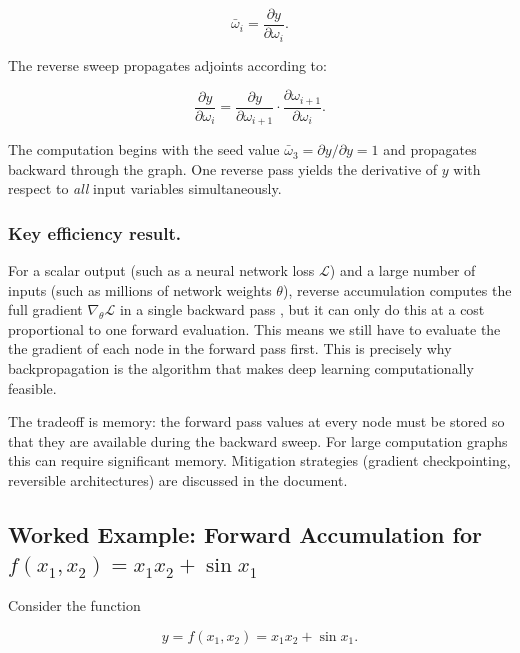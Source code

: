 \documentclass[12pt, a4paper]{article}
\begin{document}
\begin{equation}
  \bar{\omega}_i = \frac{\partial y}{\partial \omega_i}.
\end{equation}

The reverse sweep propagates adjoints according to:

\begin{equation}
  \frac{\partial y}{\partial \omega_i}
  = \frac{\partial y}{\partial \omega_{i+1}}
    \cdot \frac{\partial \omega_{i+1}}{\partial \omega_i}.
  \label{eq:BA}
\end{equation}

The computation begins with the seed value $\bar{\omega}_3 = \partial y / \partial y = 1$
and propagates backward through the graph.
One reverse pass yields the derivative of $y$ with respect to \emph{all}
input variables simultaneously.


\subsubsection{Key efficiency result.}
For a scalar output (such as a neural network loss $\mathcal{L}$) and a
large number of inputs (such as millions of network weights $\theta$),
reverse accumulation computes the full gradient $\nabla_\theta \mathcal{L}$
in a single backward pass , but it can only do this at a cost proportional to one forward
evaluation. This means we still have to evaluate the the gradient of each node in the forward pass first.
This is precisely why backpropagation is the algorithm that
makes deep learning computationally feasible.


The tradeoff is memory: the forward pass values at every node must be stored
so that they are available during the backward sweep.
For large computation graphs this can require significant memory.
Mitigation strategies (gradient checkpointing, reversible architectures) are
discussed in the document.

\subsection{Worked Example: Forward Accumulation for
             \texorpdfstring{$f(x_1, x_2) = x_1 x_2 + \sin x_1$}{f(x1, x2) = x1 x2 + sin x1}}


Consider the function

\begin{equation}
  y = f(x_1, x_2) = x_1 x_2 + \sin x_1.
\end{equation}
\end{document}
